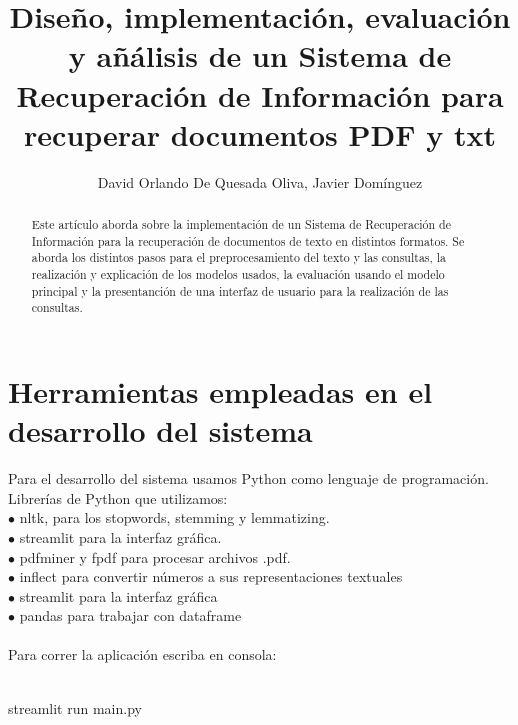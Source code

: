 \documentclass{llncs}
\begin{document}
%
\title{Diseño, implementación, evaluación y añálisis de un Sistema de Recuperación de Información para recuperar documentos PDF y txt}
\author{David Orlando De Quesada Oliva, Javier Dom\'inguez}
\maketitle

\begin{abstract}
    
    Este art\'iculo aborda sobre la implementación de un Sistema de Recuperación de Información para la recuperación 
    de documentos de texto en distintos formatos. Se aborda los distintos pasos para el preprocesamiento del texto 
    y las consultas, la realización y explicación de los modelos usados, la evaluación usando el modelo principal 
    y la presentanción de una interfaz de usuario para la realización de las consultas.
    
\end{abstract}

\tableofcontents
%



\chapter*{Herramientas empleadas en el desarrollo del sistema}

Para el desarrollo del sistema usamos Python como lenguaje de programación.\\ 
Librerías de Python que utilizamos:\\

\noindent $\bullet$ nltk, para los stopwords, stemming y lemmatizing. \\
$\bullet$ streamlit para la interfaz gráfica. \\
$\bullet$ pdfminer y fpdf para procesar archivos .pdf.\\
$\bullet$ inflect para convertir números a sus representaciones textuales\\
$\bullet$ streamlit para la interfaz gráfica \\
$\bullet$ pandas para trabajar con dataframe \\\\
Para correr la aplicación escriba en consola: \\\\
\begin{python}
    streamlit run main.py
\end{python}
\end{document}
